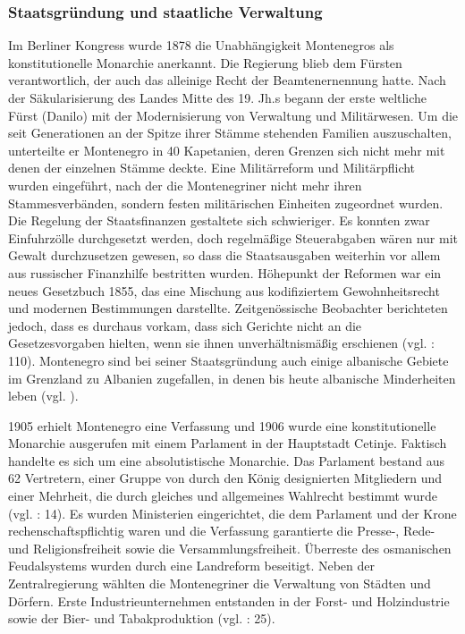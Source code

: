 \subsubsection{Staatsgründung und staatliche Verwaltung }

Im Berliner Kongress wurde 1878 die Unabhängigkeit Montenegros als konstitutionelle Monarchie anerkannt. Die Regierung blieb dem Fürsten verantwortlich, der auch das alleinige Recht der Beamtenernennung hatte. Nach der Säkularisierung des Landes Mitte des 19. Jh.s begann der erste weltliche Fürst (Danilo) mit der Modernisierung von Verwaltung und Militärwesen. Um die seit Generationen an der Spitze ihrer Stämme stehenden Familien auszuschalten, unterteilte er Montenegro in 40 Kapetanien, deren Grenzen sich nicht mehr mit denen der einzelnen Stämme deckte. Eine Militärreform und Militärpflicht wurden eingeführt, nach der die Montenegriner nicht mehr ihren Stammesverbänden, sondern festen militärischen Einheiten zugeordnet wurden. Die Regelung der Staatsfinanzen gestaltete sich schwieriger. Es konnten zwar Einfuhrzölle durchgesetzt werden, doch regelmäßige Steuerabgaben wären nur mit Gewalt durchzusetzen gewesen, so dass die Staatsausgaben weiterhin vor allem aus russischer Finanzhilfe bestritten wurden. Höhepunkt der Reformen war ein neues Gesetzbuch 1855, das eine Mischung aus kodifiziertem Gewohnheitsrecht und modernen Bestimmungen darstellte. Zeitgenössische Beobachter berichteten jedoch, dass es durchaus vorkam, dass sich Gerichte nicht an die Gesetzesvorgaben hielten, wenn sie ihnen unverhältnismäßig erschienen (vgl. \cite{dickel} : 110). Montenegro sind bei seiner Staatsgründung auch einige albanische Gebiete im Grenzland zu Albanien zugefallen, in denen bis heute albanische Minderheiten leben (vgl. \cite{hoenehhol}).\par
1905 erhielt Montenegro eine Verfassung und 1906 wurde eine konstitutionelle Monarchie ausgerufen mit einem Parlament in der Hauptstadt Cetinje. Faktisch handelte es sich um eine absolutistische Monarchie. Das Parlament bestand aus 62 Vertretern, einer Gruppe von durch den König designierten Mitgliedern und einer Mehrheit, die durch gleiches und allgemeines Wahlrecht bestimmt wurde (vgl. \cite{brepohl} : 14). Es wurden Ministerien eingerichtet, die dem Parlament und der Krone rechenschaftspflichtig waren und die Verfassung garantierte die Presse-, Rede- und Religionsfreiheit sowie die Versammlungsfreiheit. Überreste des osmanischen Feudalsystems wurden durch eine Landreform beseitigt. Neben der Zentralregierung wählten die Montenegriner die Verwaltung von Städten und Dörfern. Erste Industrieunternehmen entstanden in der Forst- und Holzindustrie sowie der Bier- und Tabakproduktion (vgl. \cite{beardradin} : 25).\par
